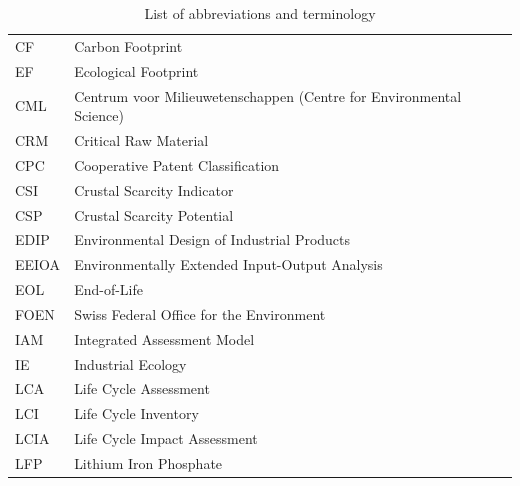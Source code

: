 \documentclass[review,3p,authoryear]{elsarticle}
\begin{document}
\begin{table}[H]
    \centering
    \caption*{List of abbreviations and terminology}\label{tab:abbreviations}
    \begin{tabular}{ll}
        \toprule
        CF                & Carbon Footprint                                                    \\
        EF                & Ecological Footprint                                                \\
        CML               & Centrum voor Milieuwetenschappen (Centre for Environmental Science) \\
        CRM               & Critical Raw Material                                               \\
        CPC               & Cooperative Patent Classification                                   \\
        CSI               & Crustal Scarcity Indicator                                          \\
        CSP               & Crustal Scarcity Potential                                          \\
        EDIP              & Environmental Design of Industrial Products                         \\
        EEIOA             & Environmentally Extended Input-Output Analysis                      \\
        EOL               & End-of-Life                                                         \\
        FOEN              & Swiss Federal Office for the Environment                            \\
        IAM               & Integrated Assessment Model                                         \\
        IE                & Industrial Ecology                                                  \\
        LCA               & Life Cycle Assessment                                               \\
        LCI               & Life Cycle Inventory                                                \\
        LCIA              & Life Cycle Impact Assessment                                        \\
        LFP               & Lithium Iron Phosphate                                              \\

\end{tabular}
\end{table}
\end{document}
